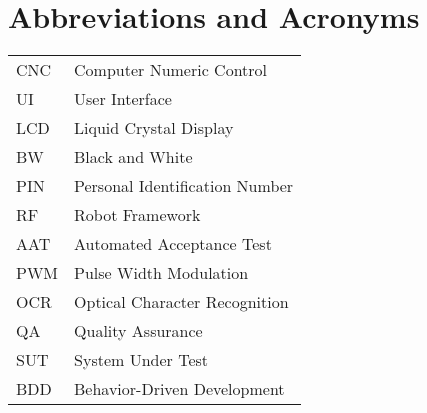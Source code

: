
\chapter*{Abbreviations and Acronyms}


\noindent
\begin{longtable}{@{}p{}p{}@{}}
CNC & Computer Numeric Control \\
UI & User Interface \\
LCD & Liquid Crystal Display \\
BW & Black and White \\
PIN & Personal Identification Number \\
RF & Robot Framework \\
AAT & Automated Acceptance Test \\
PWM & Pulse Width Modulation \\
OCR & Optical Character Recognition \\
QA & Quality Assurance \\
SUT & System Under Test \\
BDD & Behavior-Driven Development \\

\end{longtable}
